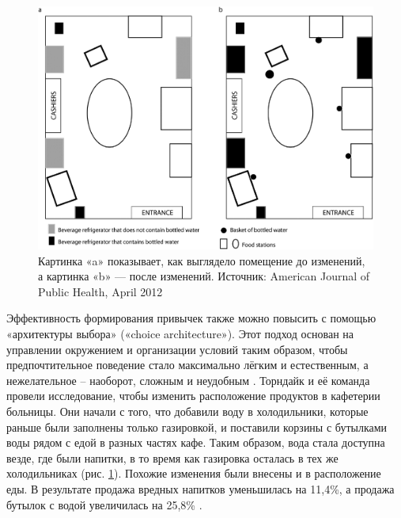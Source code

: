 \documentclass[pdflatex,sn-mathphys-num]{sn-jnl}%
\theoremstyle{thmstyleone}%
\theoremstyle{thmstyletwo}%
\theoremstyle{thmstylethree}%
\begin{document}
\begin{figure}[h]
  \centering
  \includegraphics[width=\linewidth]{figures/thorndaik_architecture_choice.jpeg}
  \caption{Картинка «a» показывает, как выглядело помещение до изменений, а картинка «b» — после изменений. Источник: American Journal of Public Health, April 2012}
  \label{fig:pic1}
\end{figure}

Эффективность формирования привычек также можно повысить с помощью «архитектуры выбора» («choice architecture»). Этот подход основан на управлении окружением и организации условий таким образом, чтобы предпочтительное поведение стало максимально лёгким и естественным, а нежелательное – наоборот, сложным и неудобным \cite{thaler_nudge_2008}. Торндайк и её команда провели исследование, чтобы изменить расположение продуктов в кафетерии больницы. Они начали с того, что добавили воду в холодильники, которые раньше были заполнены только газировкой, и поставили корзины с бутылками воды рядом с едой в разных частях кафе. Таким образом, вода стала доступна везде, где были напитки, в то время как газировка осталась в тех же холодильниках (рис. \ref{fig:pic1}). Похожие изменения были внесены и в расположение еды. В результате продажа вредных напитков уменьшилась на 11,4\%, а продажа бутылок с водой увеличилась на 25,8\% \cite{thorndike_2012}.
\end{document}
